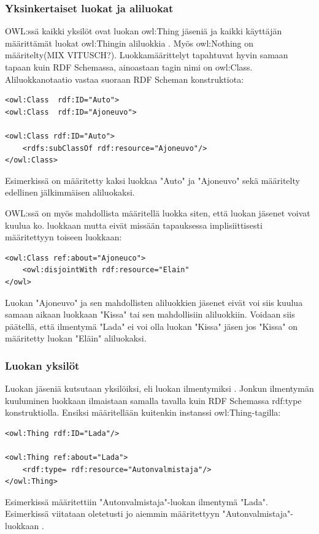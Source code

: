 \documentclass[finnish]{tktltiki2}
\theoremstyle{definition}
\theoremstyle{remark}
\begin{document}
\subsubsection{Yksinkertaiset luokat ja aliluokat}
OWL:ssä kaikki yksilöt ovat luokan owl:Thing jäseniä ja kaikki käyttäjän määrittämät luokat owl:Thingin aliluokkia \cite{SWM04}. Myös owl:Nothing on määritelty(MIX VITUSCH?). Luokkamäärittelyt tapahtuvat hyvin samaan tapaan kuin RDF Schemassa, ainoastaan tagin nimi on owl:Class. Aliluokkanotaatio vastaa suoraan RDF Scheman konstruktiota:
\begin{verbatim}
<owl:Class  rdf:ID="Auto">
<owl:Class  rdf:ID="Ajoneuvo">

<owl:Class rdf:ID="Auto">
    <rdfs:subClassOf rdf:resource="Ajoneuvo"/>
</owl:Class>
\end{verbatim}
Esimerkissä on määritetty kaksi luokkaa "Auto" ja "Ajoneuvo" sekä määritelty edellinen jälkimmäisen aliluokaksi. 

OWL:ssä on myös mahdollista määritellä luokka siten, että luokan jäsenet voivat kuulua ko. luokkaan mutta eivät missään tapauksessa
implisiittisesti määritettyyn toiseen luokkaan:
\begin{verbatim}
<owl:Class ref:about="Ajoneuco">
    <owl:disjointWith rdf:resource="Elain"
</owl>
\end{verbatim}
Luokan "Ajoneuvo" ja sen mahdollisten aliluokkien jäsenet eivät voi siis kuulua samaan aikaan luokkaan "Kissa" tai sen mahdollisiin aliluokkiin. Voidaan siis päätellä, että ilmentymä "Lada" ei voi olla luokan "Kissa" jäsen jos "Kissa" on määritetty luokan "Eläin" aliluokaksi. 

\subsubsection{Luokan yksilöt}
Luokan jäseniä kutsutaan yksilöiksi, eli luokan ilmentymiksi \cite{SWM04}. Jonkun ilmentymän kuuluminen luokkaan ilmaistaan samalla tavalla kuin RDF Schemassa rdf:type konstruktiolla. Ensiksi määritellään kuitenkin instanssi owl:Thing-tagilla:
\begin{verbatim}
<owl:Thing rdf:ID="Lada"/>

<owl:Thing ref:about="Lada">
    <rdf:type= rdf:resource="Autonvalmistaja"/>
</owl:Thing>
\end{verbatim}
Esimerkissä määritettiin "Autonvalmistaja"-luokan ilmentymä "Lada". Esimerkissä viitataan oletetusti jo aiemmin määritettyyn "Autonvalmistaja"-luokkaan \cite{SWM04}. 
\end{document}
